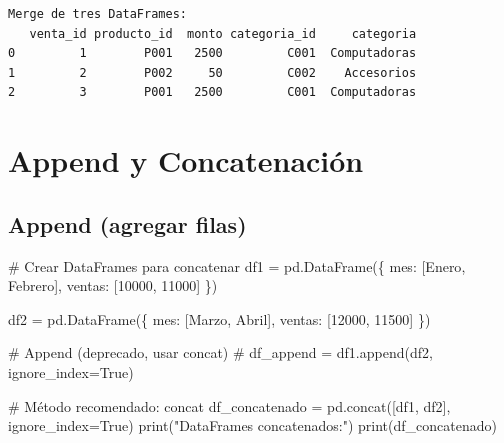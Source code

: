 \documentclass[
  doc,
  floatsintext,
  longtable,
  a4paper,
  nolmodern,
  notxfonts,
  notimes,
  12pt,
  colorlinks=true,linkcolor=blue,citecolor=blue,urlcolor=blue]{apa7}
\newenvironment{Shaded}{\begin{snugshade}}{\end{snugshade}}
\newcommand{\BuiltInTok}[1]{\textcolor[rgb]{0.00,0.23,0.31}{#1}}
\newcommand{\CommentTok}[1]{\textcolor[rgb]{0.37,0.37,0.37}{#1}}
\newcommand{\DecValTok}[1]{\textcolor[rgb]{0.68,0.00,0.00}{#1}}
\newcommand{\NormalTok}[1]{\textcolor[rgb]{0.00,0.23,0.31}{#1}}
\newcommand{\OperatorTok}[1]{\textcolor[rgb]{0.37,0.37,0.37}{#1}}
\newcommand{\StringTok}[1]{\textcolor[rgb]{0.13,0.47,0.30}{#1}}
\newcommand{\VariableTok}[1]{\textcolor[rgb]{0.07,0.07,0.07}{#1}}
\begin{document}
\begin{verbatim}
Merge de tres DataFrames:
   venta_id producto_id  monto categoria_id     categoria
0         1        P001   2500         C001  Computadoras
1         2        P002     50         C002    Accesorios
2         3        P001   2500         C001  Computadoras
\end{verbatim}

\section{Append y Concatenación}\label{append-y-concatenaciuxf3n}

\subsection{Append (agregar filas)}\label{append-agregar-filas}

\begin{Shaded}
\begin{Highlighting}[]
\CommentTok{\# Crear DataFrames para concatenar}
\NormalTok{df1 }\OperatorTok{=}\NormalTok{ pd.DataFrame(\{}
    \StringTok{\textquotesingle{}mes\textquotesingle{}}\NormalTok{: [}\StringTok{\textquotesingle{}Enero\textquotesingle{}}\NormalTok{, }\StringTok{\textquotesingle{}Febrero\textquotesingle{}}\NormalTok{],}
    \StringTok{\textquotesingle{}ventas\textquotesingle{}}\NormalTok{: [}\DecValTok{10000}\NormalTok{, }\DecValTok{11000}\NormalTok{]}
\NormalTok{\})}

\NormalTok{df2 }\OperatorTok{=}\NormalTok{ pd.DataFrame(\{}
    \StringTok{\textquotesingle{}mes\textquotesingle{}}\NormalTok{: [}\StringTok{\textquotesingle{}Marzo\textquotesingle{}}\NormalTok{, }\StringTok{\textquotesingle{}Abril\textquotesingle{}}\NormalTok{],}
    \StringTok{\textquotesingle{}ventas\textquotesingle{}}\NormalTok{: [}\DecValTok{12000}\NormalTok{, }\DecValTok{11500}\NormalTok{]}
\NormalTok{\})}

\CommentTok{\# Append (deprecado, usar concat)}
\CommentTok{\# df\_append = df1.append(df2, ignore\_index=True)}

\CommentTok{\# Método recomendado: concat}
\NormalTok{df\_concatenado }\OperatorTok{=}\NormalTok{ pd.concat([df1, df2], ignore\_index}\OperatorTok{=}\VariableTok{True}\NormalTok{)}
\BuiltInTok{print}\NormalTok{(}\StringTok{"DataFrames concatenados:"}\NormalTok{)}
\BuiltInTok{print}\NormalTok{(df\_concatenado)}
\end{Highlighting}
\end{Shaded}
\end{document}
